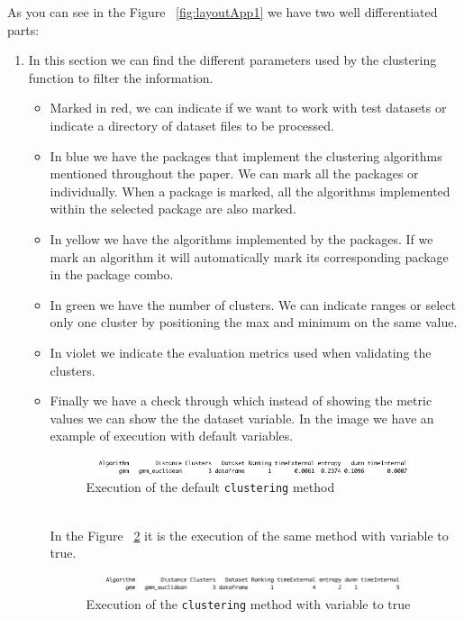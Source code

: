 As you can see in the Figure ~\ref{fig:layoutApp1} we have two well differentiated parts:
\begin{enumerate}
  \item In this section we can find the different parameters used by the clustering function to filter the information.
  \begin{itemize}
  \item Marked in red, we can indicate if we want to work with test datasets or indicate a directory of dataset files to be processed.
  \item In blue we have the packages that implement the clustering algorithms mentioned throughout the paper. We can mark all the packages or individually. When a package is marked, all the algorithms implemented within the selected package are also marked.
  \item In yellow we have the algorithms implemented by the packages. If we mark an algorithm it will automatically mark its corresponding package in the package combo.
  \item In green we have the number of clusters. We can indicate ranges or select only one cluster by positioning the max and minimum on the same value.
  \item In violet we indicate the evaluation metrics used when validating the clusters.
  \item Finally we have a check through which instead of showing the metric values we can show the the dataset variable. In the image we have an example of execution with default variables.
\begin{figure}[htbp]
  \centering
   \includegraphics[width=14cm,height=0.5cm]{img/variable_false}
    \caption{Execution of the default \texttt{clustering} method}
    \label{fig:variable_false}%
\end{figure}
\\
In the Figure ~\ref{fig:variable_true} it is the execution of the same method with variable to true.
\begin{figure}[htbp]
  \centering
   \includegraphics[width=14cm, height=0.5cm]{img/variable_true}
    \caption{Execution of the \texttt{clustering} method with variable to true}
    \label{fig:variable_true}%
\end{figure}
\\

\end{itemize}
\end{enumerate}
